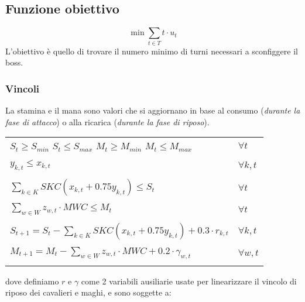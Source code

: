 \documentclass[12pt]{article}
\begin{document}
   \subsection{Funzione obiettivo}
    \begin{equation}
        \min \sum_{t \in T} t \cdot u_t
    \end{equation}
    L'obiettivo è quello di trovare il numero minimo di turni necessari a sconfiggere il boss.\\

    \subsubsection{Vincoli}
La stamina e il mana sono valori che si aggiornano in base al consumo (\textit{durante la fase di attacco}) o alla ricarica (\textit{durante la fase di riposo}).\\
    \begin{tabular*}{\textwidth}{@{\extracolsep{\fill}} ll}
        \\
        $S_{t} \geq S_{min}$ \hspace{1cm} $S_{t} \leq S_{max}$ \hspace{1cm} $M_{t} \geq M_{min}$ \hspace{1cm} $M_{t} \leq M_{max}$  & $\forall t$ \\
        \\
        $y_{k,t} \leq x_{k,t}$ & $\forall k,t$ \\
        & \\
        $\sum_{k \in K} SKC(x_{k,t} + 0.75 y_{k,t}) \leq S_t$ & $\forall t$ \\
        & \\
        $\sum_{w \in W} z_{w,t} \cdot MWC \leq M_t$ & $\forall t$ \\
        & \\
       $S_{t+1} = S_t - \sum_{k \in K} SKC (x_{k,t} +0.75 y_{k,t}) + 0.3 \cdot r_{k,t}$ & $\forall k,t$ \\
       & \\
       $M_{t+1} = M_t - \sum_{w \in W} z_{w,t} \cdot MWC + 0.2 \cdot \gamma_{w,t}$ & $\forall w,t$ \\
         & \\
    \end{tabular*}
    dove definiamo $r$ e $\gamma$ come 2 variabili ausiliarie usate per linearizzare il vincolo di riposo dei cavalieri e maghi, e sono soggette a:\\
\end{document}
